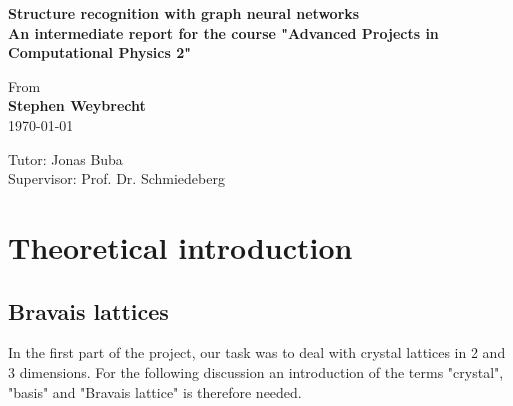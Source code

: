 \documentclass[11pt,a4paper]{article}
\begin{document}
	
\pagestyle{empty}


\begin{center}
    \vspace*{1cm}
    \LARGE \bf{Structure recognition with graph neural networks} \\

    \vspace*{2cm}
    \large \bf{An intermediate report for the course "Advanced Projects in Computational Physics 2"}


    \vspace{4cm}
    
    \vspace{1.2cm}
            From\\
            {\bf Stephen Weybrecht} \\
            \today

    \vspace*{6 cm}
    Tutor: Jonas Buba \\
    Supervisor: Prof. Dr. Schmiedeberg
    \vspace*{1 cm}

\end{center}
\clearpage
\tableofcontents
\restoregeometry
\clearpage
\mbox{}

\setcounter{page}{1}
 

\section{Theoretical introduction}
\label{sec:Theoretical introduction}

\subsection{Bravais lattices}
\label{ssec:Bravais lattices}
In the first part of the project, our task was to deal with crystal lattices in 2 and 3 dimensions. 
For the following discussion an introduction of the terms "crystal", "basis" and "Bravais lattice" is therefore needed. \\
\end{document}
